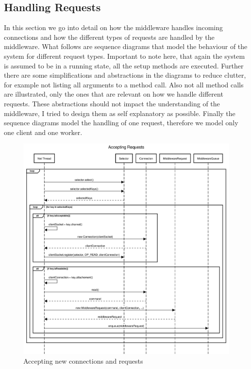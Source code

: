\documentclass[11pt,a4paper]{article}
\begin{document}
\subsection{Handling Requests}\label{subsec:handlingRequests}
%
In this section we go into detail on how the middleware handles incoming connections and how the different types of requests are handled by the middleware.
%
What follows are sequence diagrams that model the behaviour of the system for different request types.
%
Important to note here, that again the system is assumed to be in a running state, all the setup methods are executed.
%
Further there are some simplifications and abstractions in the diagrams to reduce clutter, for example not listing all arguments to a method call.
%
Also not all method calls are illustrated, only the ones that are relevant on how we handle different requests.
%
These abstractions should not impact the understanding of the middleware, I tried to design them as self explanatory as possible.
%
Finally the sequence diagrams model the handling of one request, therefore we model only one client and one worker.
%
\begin{figure}[H]
    \includegraphics[width=\linewidth]{../illustrations/accepting_requests.png}
    \caption{Accepting new connections and requests}
    \label{fig:accepting_requests}
\end{figure}
\end{document}
